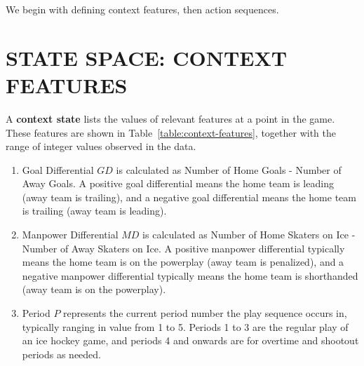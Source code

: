 \documentclass[]{article}
\begin{document}
We begin with defining context features, then action sequences.


\section{STATE SPACE: CONTEXT FEATURES}
\label{sec:context}

A \textbf{context state} lists the values of relevant features at a point in the game. These features are shown in Table~\ref{table:context-features}, together with the range of integer values observed in the data.

\begin{table}[htdp]
\caption{Context Features}
\label{table:context-features}
\begin{center}
\end{center}
\label{default}
\end{table}%

\begin{enumerate}
\item Goal Differential $GD$ is calculated as Number of Home Goals - Number of Away Goals. A positive goal differential means the home team is leading (away team is trailing), and a negative goal differential means the home team is trailing (away team is leading).
\item Manpower Differential $MD$ is calculated as Number of Home Skaters on Ice - Number of Away Skaters on Ice. A positive manpower differential typically means the home team is on the powerplay (away team is penalized), and a negative manpower differential typically means the home team is shorthanded (away team is on the powerplay).
\item Period $P$ represents the current period number the play sequence occurs in, typically ranging in value from 1 to 5. Periods 1 to 3 are the regular play of an ice hockey game, and periods 4 and onwards are for overtime and shootout periods as needed.
\end{enumerate}
\end{document}
